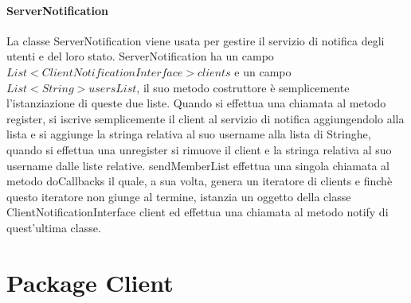 \documentclass[]{article}
\begin{document}
\paragraph{ServerNotification} La classe ServerNotification viene usata per gestire il servizio di notifica degli utenti e del loro stato. ServerNotification ha un campo $List<ClientNotificationInterface> clients$ e un campo $List<String> usersList$, il suo metodo costruttore è semplicemente l'istanziazione di queste due liste. Quando si effettua una chiamata al metodo register, si iscrive semplicemente il client al servizio di notifica aggiungendolo alla lista e si aggiunge la stringa relativa al suo username alla lista di Stringhe, quando si effettua una unregister si rimuove il client e la stringa relativa al suo username dalle liste relative.
sendMemberList effettua una singola chiamata al metodo doCallbacks il quale, a sua volta, genera un iteratore di clients e finchè questo iteratore non giunge al termine, istanzia un oggetto della classe ClientNotificationInterface client ed effettua una chiamata al metodo notify di quest'ultima classe.\newpage
\section{Package Client}
\end{document}
